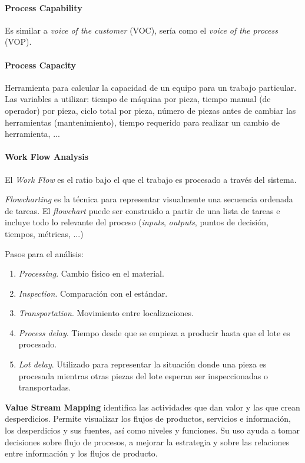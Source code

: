 \documentclass[]{article}
\begin{document}
\paragraph{Process Capability}
Es similar a \textit{voice of the customer} (VOC), sería como el \textit{voice of the process} (VOP).

\paragraph{Process Capacity}
Herramienta para calcular la capacidad de un equipo para un trabajo particular. Las variables a utilizar: tiempo de máquina por pieza, tiempo manual (de operador) por pieza, ciclo total por pieza, número de piezas antes de cambiar las herramientas (mantenimiento), tiempo requerido para realizar un cambio de herramienta, ...

\paragraph{Work Flow Analysis}
El \textit{Work Flow} es el ratio bajo el que el trabajo es procesado a través del sistema.

\textit{Flowcharting} es la técnica para representar visualmente una secuencia ordenada de tareas. El \textit{flowchart} puede ser construido a partir de una lista de tareas e incluye todo lo relevante del proceso (\textit{inputs}, \textit{outputs}, puntos de decisión, tiempos, métricas, ...)

Pasos para el análisis:
\begin{enumerate}
	\item \textit{Processing}. Cambio físico en el material.
	\item \textit{Inspection}. Comparación con el estándar.
	\item \textit{Transportation}. Movimiento entre localizaciones.
	\item \textit{Process delay}. Tiempo desde que se empieza a producir hasta que el lote es procesado.
	\item \textit{Lot delay}. Utilizado para representar la situación donde una pieza es procesada mientras otras piezas del lote esperan ser inspeccionadas o transportadas.
\end{enumerate}

\textbf{Value Stream Mapping} identifica las actividades que dan valor y las que crean desperdicios. Permite visualizar los flujos de productos, servicios e información, los desperdicios y sus fuentes, así como niveles y funciones. Su uso ayuda a tomar decisiones sobre flujo de procesos, a mejorar la estrategia y sobre las relaciones entre información y los flujos de producto.
\end{document}
